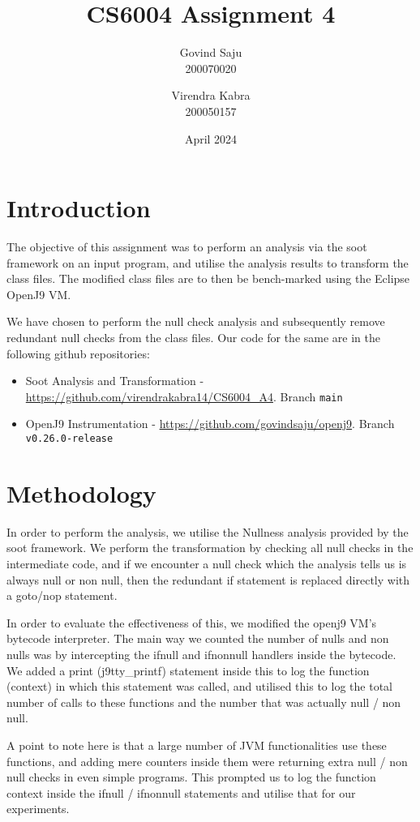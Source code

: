 \documentclass{article}
\title{CS6004 Assignment 4}
\author{Govind Saju \\ 200070020  \and Virendra Kabra \\ 200050157}
\date{April 2024}
\begin{document}
\maketitle

\section{Introduction}
The objective of this assignment was to perform an analysis via the soot framework on an input program, and utilise the analysis results to transform the class files. The modified class files are to then be bench-marked using the Eclipse OpenJ9 VM.

We have chosen to perform the null check analysis and subsequently remove redundant null checks from the class files. Our code for the same are in the following github repositories:
\begin{itemize}
    \item Soot Analysis and Transformation - \url{https://github.com/virendrakabra14/CS6004_A4}. Branch \texttt{main}
    \item OpenJ9 Instrumentation - \url{https://github.com/govindsaju/openj9}. Branch \texttt{v0.26.0-release}
\end{itemize}

\section{Methodology}
In order to perform the analysis, we utilise the Nullness analysis provided by the soot framework. We perform the transformation by checking all null checks in the intermediate code, and if we encounter a null check which the analysis tells us is always null or non null, then the redundant if statement is replaced directly with a goto/nop statement. 

In order to evaluate the effectiveness of this, we modified the openj9 VM's bytecode interpreter. The main way we counted the number of nulls and non nulls was by intercepting the ifnull and ifnonnull handlers inside the bytecode. We added a print (j9tty\_printf) statement inside this to log the function (context) in which this statement was called, and utilised this to log the total number of calls to these functions and the number that was actually null / non null.

A point to note here is that a large number of JVM functionalities use these functions, and adding mere counters inside them were returning extra null / non null checks in even simple programs. This prompted us to log the function context inside the ifnull / ifnonnull statements and utilise that for our experiments.
\end{document}
